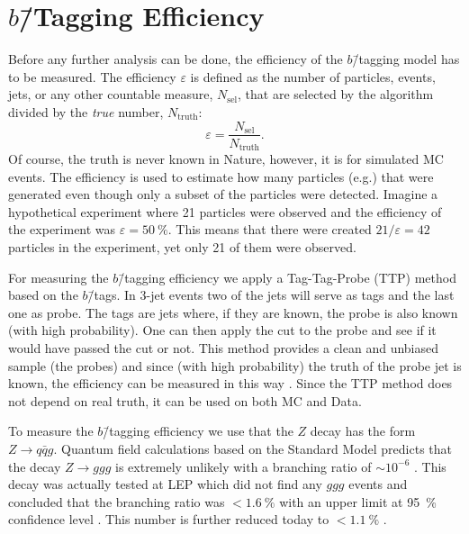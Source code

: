 \section[b-Tagging Efficiency]{$b$\=/Tagging Efficiency}
\label{sec:q:b_tagging_effiency}

Before any further analysis can be done, the efficiency of the $b$\=/tagging model has to be measured. The efficiency $\varepsilon$ is defined as the number of particles, events, jets, or any other countable measure, $N_\mathrm{sel}$, that are selected by the algorithm divided by the \emph{true} number, $N_\mathrm{truth}$:
\begin{equation}
  \varepsilon = \frac{N_\mathrm{sel}}{N_\mathrm{truth}}. 
\end{equation}
Of course, the truth is never known in Nature, however, it is for simulated MC events. The efficiency is used to estimate how many particles (e.g.) that were generated even though only a subset of the particles were detected. Imagine a hypothetical experiment where \num{21} particles were observed and the efficiency of the experiment was $\varepsilon=\SI{50}{\percent}$. This means that there were created $21 / \varepsilon = 42$ particles in the experiment, yet only \num{21} of them were observed.

For measuring the $b$\=/tagging efficiency we apply a Tag-Tag-Probe (TTP) method based on the $b$\=/tags. In 3-jet events two of the jets will serve as tags and the last one as probe. The tags are jets where, if they are known, the probe is also known (with high probability). One can then apply the cut to the probe and see if it would have passed the cut or not. This method provides a clean and unbiased sample (the probes) and since (with high probability) the truth of the probe jet is known, the efficiency can be measured in this way \autocite{atlascollaborationElectronEfficiencyMeasurements2017}. Since the TTP method does not depend on real truth, it can be used on both MC and Data.

To measure the $b$\=/tagging efficiency we use that the $Z$ decay has the form $Z \rightarrow q\bar{q}g$. Quantum field calculations based on the Standard Model predicts that the decay $Z \rightarrow ggg$ is extremely unlikely with a branching ratio of $\sim 10^{-6}$ \autocite{vanderbijBosonProductionDecay1989}. This decay was actually tested at LEP which did not find any $ggg$ events and concluded that the branching ratio was $< \SI{1.6}{\percent}$ with an upper limit at \SI{95}{\percent} confidence level \autocite{damUpperLimitBr1996}. This number is further reduced today to $<\SI{1.1}{\percent}$ \autocite{particledatagroupReviewParticlePhysics2018}. 


